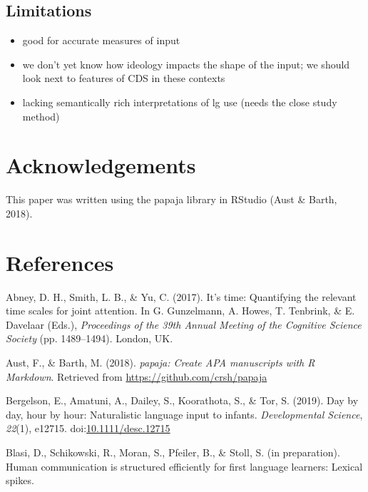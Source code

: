 \documentclass[,man,floatsintext]{apa6}
\providecommand{\tightlist}{%
  \setlength{\itemsep}{0pt}\setlength{\parskip}{0pt}}
\begin{document}
\subsection{Limitations}\label{limitations}

\begin{itemize}
\tightlist
\item
  good for accurate measures of input
\item
  we don't yet know how ideology impacts the shape of the input; we
  should look next to features of CDS in these contexts
\item
  lacking semantically rich interpretations of lg use (needs the close
  study method)
\end{itemize}

\section{Acknowledgements}\label{acknowledgements}

This paper was written using the papaja library in RStudio (Aust \&
Barth, 2018).

\newpage

\section{References}\label{refs}

\begingroup
\setlength{\parindent}{-0.5in} \setlength{\leftskip}{0.5in}

\hypertarget{refs}{}
\hypertarget{ref-abney2017time}{}
Abney, D. H., Smith, L. B., \& Yu, C. (2017). It's time: Quantifying the
relevant time scales for joint attention. In G. Gunzelmann, A. Howes, T.
Tenbrink, \& E. Davelaar (Eds.), \emph{Proceedings of the 39th Annual
Meeting of the Cognitive Science Society} (pp. 1489--1494). London, UK.

\hypertarget{ref-R-papaja}{}
Aust, F., \& Barth, M. (2018). \emph{papaja: Create APA manuscripts with
R Markdown}. Retrieved from \url{https://github.com/crsh/papaja}

\hypertarget{ref-bergelson2019day}{}
Bergelson, E., Amatuni, A., Dailey, S., Koorathota, S., \& Tor, S.
(2019). Day by day, hour by hour: Naturalistic language input to
infants. \emph{Developmental Science}, \emph{22}(1), e12715.
doi:\href{https://doi.org/10.1111/desc.12715}{10.1111/desc.12715}

\hypertarget{ref-blasiIPhuman}{}
Blasi, D., Schikowski, R., Moran, S., Pfeiler, B., \& Stoll, S. (in
preparation). Human communication is structured efficiently for first
language learners: Lexical spikes.
\end{document}
